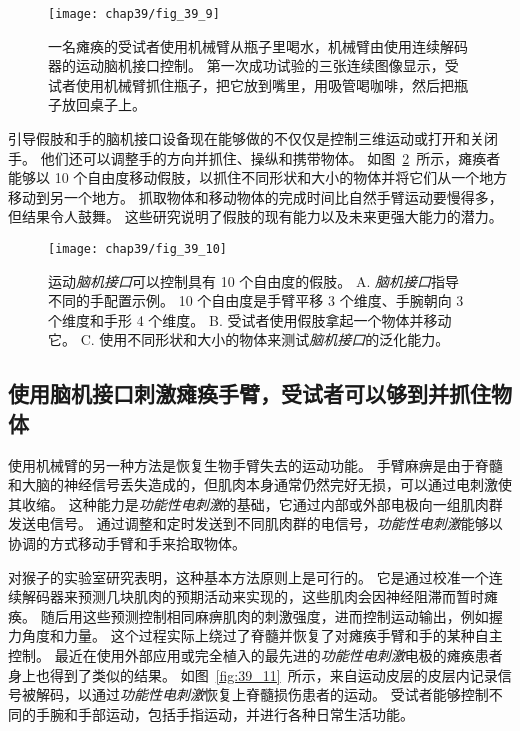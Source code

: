 \begin{figure}[htbp]
	\centering
	\texttt{[image: chap39/fig\_39\_9]}
	\caption{一名瘫痪的受试者使用机械臂从瓶子里喝水，机械臂由使用连续解码器的运动脑机接口控制。 
		第一次成功试验的三张连续图像显示，受试者使用机械臂抓住瓶子，把它放到嘴里，用吸管喝咖啡，然后把瓶子放回桌子上\cite{hochberg2012reach}。}
	\label{fig:39_9}
\end{figure}


引导假肢和手的脑机接口设备现在能够做的不仅仅是控制三维运动或打开和关闭手。
他们还可以调整手的方向并抓住、操纵和携带物体。
如图~\ref{fig:39_10}~所示，瘫痪者能够以 10 个自由度移动假肢，以抓住不同形状和大小的物体并将它们从一个地方移动到另一个地方。
抓取物体和移动物体的完成时间比自然手臂运动要慢得多，但结果令人鼓舞。
这些研究说明了假肢的现有能力以及未来更强大能力的潜力。


\begin{figure}[htbp]
	\centering
	\texttt{[image: chap39/fig\_39\_10]}
	\caption{运动\textit{脑机接口}可以控制具有 10 个自由度的假肢。 
		A. \textit{脑机接口}指导不同的手配置示例。
		10 个自由度是手臂平移 3 个维度、手腕朝向 3 个维度和手形 4 个维度。
		B. 受试者使用假肢拿起一个物体并移动它。
		C. 使用不同形状和大小的物体来测试\textit{脑机接口}的泛化能力\cite{wodlinger2014ten}。}
	\label{fig:39_10}
\end{figure}



\subsection{使用脑机接口刺激瘫痪手臂，受试者可以够到并抓住物体}

使用机械臂的另一种方法是恢复生物手臂失去的运动功能。
手臂麻痹是由于脊髓和大脑的神经信号丢失造成的，但肌肉本身通常仍然完好无损，可以通过电刺激使其收缩。
这种能力是\textit{功能性电刺激}的基础，它通过内部或外部电极向一组肌肉群发送电信号。
通过调整和定时发送到不同肌肉群的电信号，\textit{功能性电刺激}能够以协调的方式移动手臂和手来拾取物体。


对猴子的实验室研究表明，这种基本方法原则上是可行的。
它是通过校准一个连续解码器来预测几块肌肉的预期活动来实现的，这些肌肉会因神经阻滞而暂时瘫痪。
随后用这些预测控制相同麻痹肌肉的刺激强度，进而控制运动输出，例如握力角度和力量。
这个过程实际上绕过了脊髓并恢复了对瘫痪手臂和手的某种自主控制。
最近在使用外部应用或完全植入的最先进的\textit{功能性电刺激}电极的瘫痪患者身上也得到了类似的结果。
如图~\ref{fig:39_11}~所示，来自运动皮层的皮层内记录信号被解码，以通过\textit{功能性电刺激}恢复上脊髓损伤患者的运动。
受试者能够控制不同的手腕和手部运动，包括手指运动，并进行各种日常生活功能。


